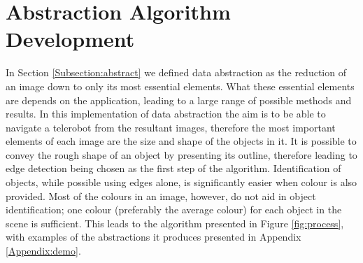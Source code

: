 \chapter{Abstraction Algorithm Development}
\label{chapter:abstract}

In Section \ref{Subsection:abstract} we defined data abstraction as the reduction of an image down to only its most essential elements. What these essential elements are depends on the application, leading to a large range of possible methods and results. In this implementation of data abstraction the aim is to be able to navigate a telerobot from the resultant images, therefore the most important elements of each image are the size and shape of the objects in it. It is possible to convey the rough shape of an object by presenting its outline, therefore leading to edge detection being chosen as the first step of the algorithm. Identification of objects, while possible using edges alone, is significantly easier when colour is also provided. Most of the colours in an image, however, do not aid in object identification; one colour (preferably the average colour) for each object in the scene is sufficient. This leads to the algorithm presented in Figure \ref{fig:process}, with examples of the abstractions it produces presented in Appendix \ref{Appendix:demo}.

